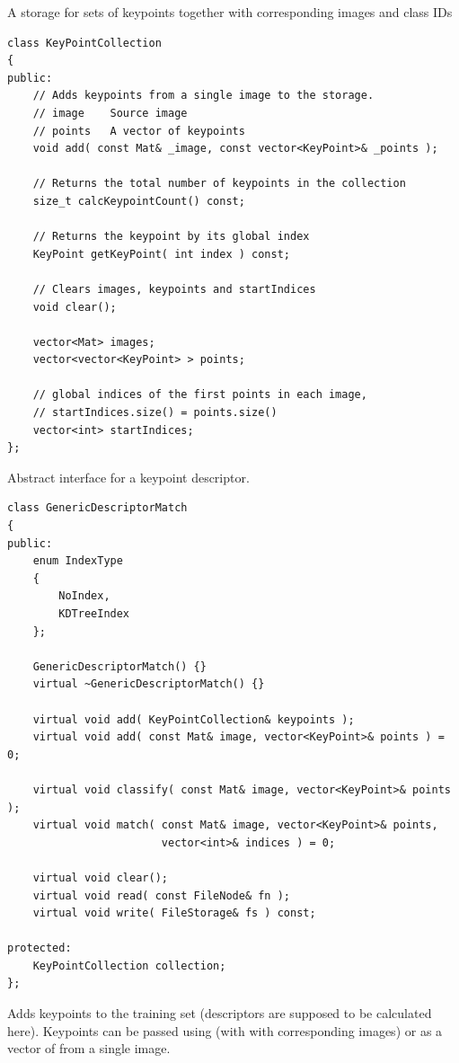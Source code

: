 A storage for sets of keypoints together with corresponding images and class IDs

\begin{lstlisting}
class KeyPointCollection
{
public:
    // Adds keypoints from a single image to the storage.
    // image    Source image
    // points   A vector of keypoints
    void add( const Mat& _image, const vector<KeyPoint>& _points );

    // Returns the total number of keypoints in the collection
    size_t calcKeypointCount() const;

    // Returns the keypoint by its global index
    KeyPoint getKeyPoint( int index ) const;

    // Clears images, keypoints and startIndices
    void clear();

    vector<Mat> images;
    vector<vector<KeyPoint> > points;

    // global indices of the first points in each image,
    // startIndices.size() = points.size()
    vector<int> startIndices;
};
\end{lstlisting}

Abstract interface for a keypoint descriptor.

\begin{lstlisting}
class GenericDescriptorMatch
{
public:
    enum IndexType
    {
        NoIndex,
        KDTreeIndex
    };

    GenericDescriptorMatch() {}
    virtual ~GenericDescriptorMatch() {}

    virtual void add( KeyPointCollection& keypoints );
    virtual void add( const Mat& image, vector<KeyPoint>& points ) = 0;

    virtual void classify( const Mat& image, vector<KeyPoint>& points );
    virtual void match( const Mat& image, vector<KeyPoint>& points,
                        vector<int>& indices ) = 0;
    
    virtual void clear();
	virtual void read( const FileNode& fn );
    virtual void write( FileStorage& fs ) const;
    
protected:
    KeyPointCollection collection;
};

\end{lstlisting}
Adds keypoints to the training set (descriptors are supposed to be calculated here).
Keypoints can be passed using  (with with corresponding images) or as a vector of  from a single image.

